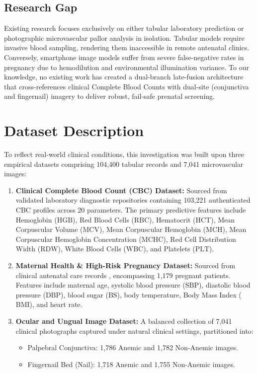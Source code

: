 \documentclass[journal,10pt,twocolumn]{IEEEtran}
\begin{document}
\subsection{Research Gap}
Existing research focuses exclusively on either tabular laboratory prediction or photographic microvascular pallor analysis in isolation. Tabular models require invasive blood sampling, rendering them inaccessible in remote antenatal clinics. Conversely, smartphone image models suffer from severe false-negative rates in pregnancy due to hemodilution and environmental illumination variance. To our knowledge, no existing work has created a dual-branch late-fusion architecture that cross-references clinical Complete Blood Counts with dual-site (conjunctiva and fingernail) imagery to deliver robust, fail-safe prenatal screening.

\section{Dataset Description}
To reflect real-world clinical conditions, this investigation was built upon three empirical datasets comprising 104,400 tabular records and 7,041 microvascular images:

\begin{enumerate}
    \item \textbf{Clinical Complete Blood Count (CBC) Dataset:} Sourced from validated laboratory diagnostic repositories containing 103,221 authenticated CBC profiles across 20 parameters. The primary predictive features include Hemoglobin ($\text{HGB}$), Red Blood Cells ($\text{RBC}$), Hematocrit ($\text{HCT}$), Mean Corpuscular Volume ($\text{MCV}$), Mean Corpuscular Hemoglobin ($\text{MCH}$), Mean Corpuscular Hemoglobin Concentration ($\text{MCHC}$), Red Cell Distribution Width ($\text{RDW}$), White Blood Cells ($\text{WBC}$), and Platelets ($\text{PLT}$).
    \item \textbf{Maternal Health \& High-Risk Pregnancy Dataset:} Sourced from clinical antenatal care records \cite{maternal_survey2024synthesis}, encompassing 1,179 pregnant patients. Features include maternal age, systolic blood pressure ($\text{SBP}$), diastolic blood pressure ($\text{DBP}$), blood sugar ($\text{BS}$), body temperature, Body Mass Index ($\text{BMI}$), and heart rate.
    \item \textbf{Ocular and Ungual Image Dataset:} A balanced collection of 7,041 clinical photographs captured under natural clinical settings, partitioned into:
    \begin{itemize}
        \item Palpebral Conjunctiva: 1,786 Anemic and 1,782 Non-Anemic images.
        \item Fingernail Bed (Nail): 1,718 Anemic and 1,755 Non-Anemic images.
    \end{itemize}
\end{enumerate}
\end{document}
